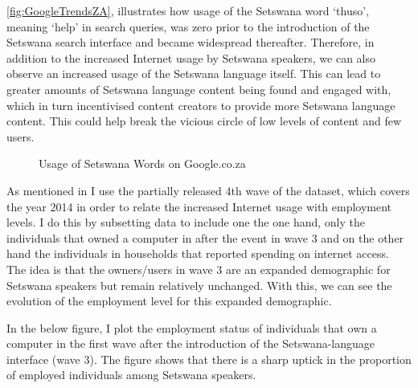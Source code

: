 \documentclass[a4paper,british]{article}\usepackage[]{graphicx}\usepackage[]{color}
\makeatletter
\newenvironment{kframe}{%
 \def\at@end@of@kframe{}%
 \ifinner\ifhmode%
  \def\at@end@of@kframe{\end{minipage}}%
  \begin{minipage}{\columnwidth}%
 \fi\fi%
 \def\FrameCommand##1{\hskip\@totalleftmargin \hskip-\fboxsep
 \colorbox{shadecolor}{##1}\hskip-\fboxsep
     \hskip-\linewidth \hskip-\@totalleftmargin \hskip\columnwidth}%
 \MakeFramed {\advance\hsize-\width
   \@totalleftmargin\z@ \linewidth\hsize
   \@setminipage}}%
 {\par\unskip\endMakeFramed%
 \at@end@of@kframe}
\newenvironment{knitrout}{}{} %
\let\ref\autoref
\makeatother
\begin{document}
\ref{fig:GoogleTrendsZA}, illustrates how usage of the Setswana word
`thuso', meaning `help' in search queries, was zero prior to the introduction
of the Setswana search interface and became widespread thereafter.
Therefore, in addition to the increased Internet usage by Setswana
speakers, we can also observe an increased usage of the Setswana language
itself. This can lead to greater amounts of Setswana language content
being found and engaged with, which in turn incentivised content creators
to provide more Setswana language content. This could help break the
vicious circle of low levels of content and few users.

\begin{figure}[H]
\caption{Usage of Setswana Words on Google.co.za}

\label{fig:GoogleTrendsZA}

\begin{knitrout}
\color{fgcolor}\begin{kframe}


{\ttfamily\noindent\bfseries\color{errorcolor}{\#\# Error in ggplot(thuso): object 'thuso' not found}}\end{kframe}
\end{knitrout}
\end{figure}

As mentioned in  I use the partially released 4th wave
of the dataset, which covers the year 2014 in order to relate the
increased Internet usage with employment levels. I do this by subsetting
data to include one the one hand, only the individuals that owned
a computer in after the event in wave 3 and on the other hand the
individuals in households that reported spending on internet access.
The idea is that the owners/users in wave 3 are an expanded demographic
for Setswana speakers but remain relatively unchanged. With this,
we can see the evolution of the employment level for this expanded
demographic.

In the below figure, I plot the employment status of individuals that
own a computer in the first wave after the introduction of the Setswana-language
interface (wave 3). The figure shows that there is a sharp uptick
in the proportion of employed individuals among Setswana speakers. 
\end{document}
